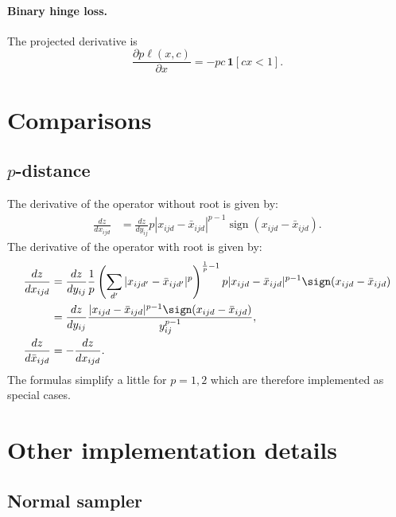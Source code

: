 \paragraph{Binary hinge loss.} The projected derivative is
\[
\frac{\partial p \ell(x,c)}{\partial x}
=
- pc\,\mathbf{1}[cx < 1].
\]

\section{Comparisons}\label{s:impl-comparisons}

\subsection{$p$-distance}\label{s:impl-pdistance}

The derivative of the operator without root is given by:
\begin{align*}
\frac{dz}{dx_{ijd}}
&=
\frac{dz}{dy_{ij}}
p |x_{ijd} - \bar x_{ijd}|^{p-1} \operatorname{sign} (x_{ijd} - \bar x_{ijd}).
\end{align*}
The derivative of the operator with root is given by:
\begin{align*}
\frac{dz}{dx_{ijd}}
&=
\frac{dz}{dy_{ij}}
\frac{1}{p}
\left(\sum_{d'} |x_{ijd'} - \bar x_{ijd'}|^p \right)^{\frac{1}{p}-1}
p |x_{ijd} - \bar x_{ijd}|^{p-1} \sign(x_{ijd} - \bar x_{ijd})
\\
&= 
\frac{dz}{dy_{ij}}
\frac{|x_{ijd} - \bar x_{ijd}|^{p-1} \sign(x_{ijd} - \bar x_{ijd})}{y_{ij}^{p-1}}, \\
\frac{dz}{d\bar x_{ijd}} &= -\frac{dz}{dx_{ijd}}.
\end{align*}
The formulas simplify a little for $p=1,2$ which are therefore implemented as special cases.


\section{Other implementation details}\label{s:impl-others}

\subsection{Normal sampler}\label{s:impl-normal}

